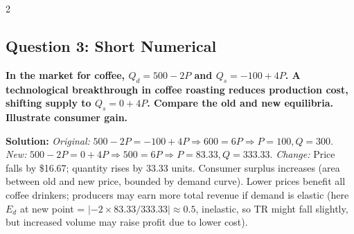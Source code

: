 \documentclass[10pt,a4paper]{article}
\begin{document}
\begin{multicols}{2}
\subsection*{Question 3: Short Numerical}
\textbf{In the market for coffee, $Q_d = 500 - 2P$ and $Q_s = -100 + 4P$. A technological breakthrough in coffee roasting reduces production cost, shifting supply to $Q_s = 0 + 4P$. Compare the old and new equilibria. Illustrate consumer gain.}

\vspace{0.1cm}
\textbf{Solution:}
\textit{Original:} $500 - 2P = -100 + 4P \Rightarrow 600 = 6P \Rightarrow P = 100, Q = 300$.
\textit{New:} $500 - 2P = 0 + 4P \Rightarrow 500 = 6P \Rightarrow P = 83.33, Q = 333.33$.
\textit{Change:} Price falls by \$16.67; quantity rises by 33.33 units. Consumer surplus increases (area between old and new price, bounded by demand curve). Lower prices benefit all coffee drinkers; producers may earn more total revenue if demand is elastic (here $E_d$ at new point = $|-2 \times 83.33/333.33| \approx 0.5$, inelastic, so TR might fall slightly, but increased volume may raise profit due to lower cost).

\end{multicols}
\end{document}
